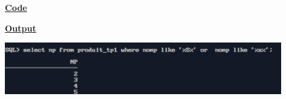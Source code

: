 \newpage
{}

\textbf{\underline{Code}}


\vspace{1cm}
\textbf{\underline{Output}}
\vspace{1cm}
\begin{center}
    \includegraphics[width=0.9\textwidth]{Questions/q14/q14.png}
\end{center}


